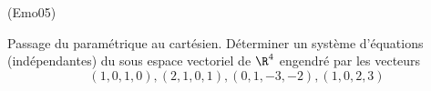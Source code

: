 \begin{tiny}(Emo05)\end{tiny}
Passage du param{\'e}trique au cart{\'e}sien.\newline
D{\'e}terminer un syst{\`e}me d'{\'e}quations (ind{\'e}pendantes) du sous espace vectoriel de $\R^{4}$ engendr{\'e} par les vecteurs
\[
(1,0,1,0),(2,1,0,1),(0,1,-3,-2),(1,0,2,3)
\]
